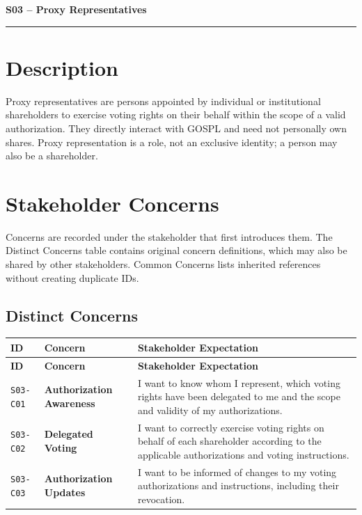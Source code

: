 \documentclass[11pt,a4paper]{article}
\begin{document}

{\LARGE\bfseries S03 -- Proxy Representatives\par}\vspace{1em}
\noindent\rule{\linewidth}{0.4pt}

\section*{Description}

Proxy representatives are persons appointed by individual or institutional shareholders to exercise voting rights on their behalf within the scope of a valid authorization. They directly interact with GOSPL and need not personally own shares. Proxy representation is a role, not an exclusive identity; a person may also be a shareholder.

\section*{Stakeholder Concerns}

Concerns are recorded under the stakeholder that first introduces them. The Distinct Concerns table contains original concern definitions, which may also be shared by other stakeholders. Common Concerns lists inherited references without creating duplicate IDs.

\subsection*{Distinct Concerns}

\begingroup\small
\begin{longtable}{@{}>{\raggedright\arraybackslash}p{}>{\raggedright\arraybackslash}p{}>{\raggedright\arraybackslash}p{}@{}}
\toprule
\textbf{ID} & \textbf{Concern} & \textbf{Stakeholder Expectation} \\
\midrule
\endfirsthead
\toprule
\textbf{ID} & \textbf{Concern} & \textbf{Stakeholder Expectation} \\
\midrule
\endhead
\bottomrule
\endfoot
\texttt{S03-C01} & \textbf{Authorization Awareness} & I want to know whom I represent, which voting rights have been delegated to me and the scope and validity of my authorizations. \\
\addlinespace
\texttt{S03-C02} & \textbf{Delegated Voting} & I want to correctly exercise voting rights on behalf of each shareholder according to the applicable authorizations and voting instructions. \\
\addlinespace
\texttt{S03-C03} & \textbf{Authorization Updates} & I want to be informed of changes to my voting authorizations and instructions, including their revocation. \\
\end{longtable}
\endgroup
\end{document}
